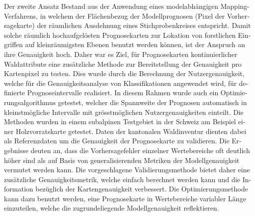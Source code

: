\begin{otherlanguage}{ngerman}
Der zweite Ansatz Bestand aus der Anwendung eines modelabhängigen Mapping-Verfahrens, in welchem der Flächenbezug der Modellprognosen (Pixel der Vorhersagekarte) der räumlichen Ausdehnung eines Stichprobenkreises entspricht. Damit solche räumlich hochaufgelösten Prognosekarten zur Lokation von forstlichen Eingriffen auf kleinräumigsten Ebenen benutzt werden können, ist der Anspruch an ihre Genauigkeit hoch. Daher war es Ziel, für Prognosekarten kontinuierlicher Waldattribute eine zusätzliche Methode zur Bereitstellung der Genauigkeit pro Kartenpixel zu testen. Dies wurde durch die Berechnung der Nutzergenauigkeit, welche für die Genauigkeitsanalyse von Klassifikationen angewendet wird, für definierte Prognoseintervalle realisiert. In diesem Rahmen wurde auch ein Optimierungsalgorithmus getestet, welcher die Spannweite der Prognosen automatisch in kleinstmögliche Intervalle mit grösstmöglichen Nutzergenauigkeiten einteilt. Die Methoden wurden in einem subalpinen Testgebiet in der Schweiz am Beispiel einer Holzvorratskarte getestet. Daten der kantonalen Waldinventur dienten dabei als Referenzdaten um die Genauigkeit der Prognosekarte zu validieren. Die Ergebnisse deuten an, dass die Vorhersagefehler einzelner Wertebereiche oft deutlich höher sind als auf Basis von generalisierenden Metriken der Modellgenauigkeit vermutet werden kann. Die vorgeschlagene Validierungsmethode bietet daher eine zusätzliche Genauigkeitsmetrik, welche einfach berechnet werden kann und die Information bezüglich der Kartengenauigkeit verbessert. Die Optimierungsmethode kann dazu benutzt werden, eine Prognosekarte in Wertebereiche variabler Länge einzuteilen, welche die zugrundeliegende Modellgenauigkeit reflektieren.

\end{otherlanguage}



